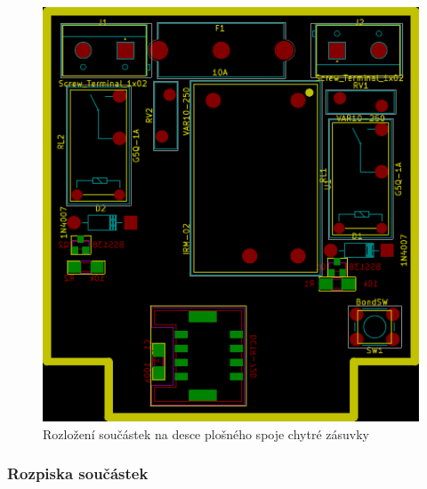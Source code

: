\documentclass[12pt,a4paper,oneside]{article}
\begin{document}
\begin{figure}[H]
\label{fig:components}
\minipage{\textwidth}
\includegraphics[width = 128mm]{img/components.pdf}
\caption{Rozložení součástek na desce plošného spoje chytré zásuvky}
\endminipage
\end{figure}

\subsubsection{Rozpiska součástek}
\end{document}
